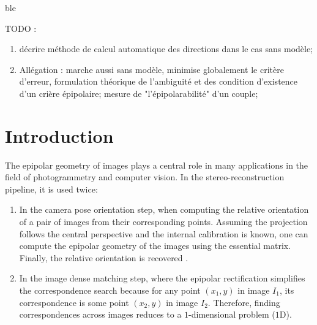 \documentclass{ipol}
\begin{document}
\begin{ipolAbstract}
ble
\end{ipolAbstract}


TODO :
\begin{enumerate}
   \item  décrire méthode de calcul automatique des directions dans le cas sans modèle;

   \item Allégation :  marche aussi sans modèle, minimise globalement le critère d'erreur, 
         formulation théorique de l'ambiguité et des condition d'existence d'un crière épipolaire;
         mesure de "l'épipolarabilité" d'un couple;
 
\end{enumerate}

\section{Introduction}
The epipolar geometry of images plays a central role in many applications in the field of photogrammetry and computer vision. In the stereo-reconstruction pipeline, it is used twice:

\begin{enumerate}
   \item In the camera pose orientation step, when computing the
      relative orientation of a pair of images from their corresponding points. Assuming 
      the projection follows the central perspective and the internal calibration is known,
      one can compute the epipolar geometry of the images using the essential matrix. Finally, the relative orientation is recovered \cite{fusiello2000epi}.   
     
   \item In the image dense matching step, where the epipolar rectification simplifies the 
       correspondence search because for any point $(x_1,y)$ in image $I_1$, its correspondence is some point $(x_2,y)$ in image $I_2$. Therefore, finding correspondences across images reduces to 
        a $1$-dimensional problem ($1$D).
\end{enumerate}
\end{document}
